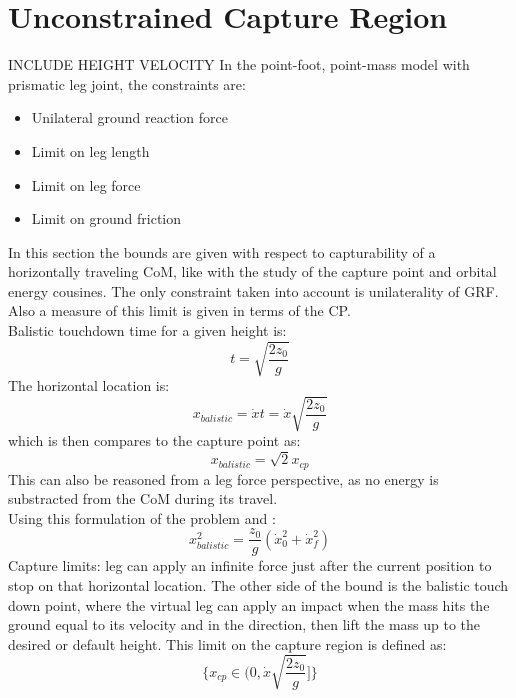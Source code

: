 \section{Unconstrained Capture Region}
INCLUDE HEIGHT VELOCITY
In the point-foot, point-mass model with prismatic leg joint, the constraints are:
\begin{itemize}
	\item Unilateral ground reaction force
	\item Limit on leg length
	\item Limit on leg force
	\item Limit on ground friction
\end{itemize}
In this section the bounds are given with respect to capturability of a horizontally traveling CoM, like with the study of the capture point and orbital energy cousines. The only constraint taken into account is unilaterality of GRF. Also a measure of this limit is given in terms of the CP.\\
Balistic touchdown time for a given height is:
\begin{equation}
	t = \sqrt{\frac{2z_0}{g}}
\end{equation}
The horizontal location is:
\begin{equation}
	x_{balistic}= \dot{x}t=\dot{x}\sqrt{\frac{2z_0}{g}} 
\end{equation}
which is then compares to the capture point as:
\begin{equation}
    x_{balistic}=\sqrt{2}x_{cp}
\end{equation}
This can also be reasoned from a leg force perspective, as no energy is substracted from the CoM during its travel. \\
Using this formulation of the problem and \Elip:
\begin{equation}
   x_{balistic}^2 = \frac{z_0}{g}(\dot{x}_0^2 + \dot{x}_f^2) 
\end{equation}
Capture limits: leg can apply an infinite force just after the current position to stop on that horizontal location. The other side of the bound is the balistic touch down point, where the virtual leg can apply an impact when the mass hits the ground equal to its velocity and in the direction, then lift the mass up to the desired or default height. This limit on the capture region is defined as:
\begin{equation}
\{x_{cp} \in (0, \dot{x}\sqrt{\frac{2z_0}{g}} ]\}
\end{equation}
\cite{koolen2016balance}
